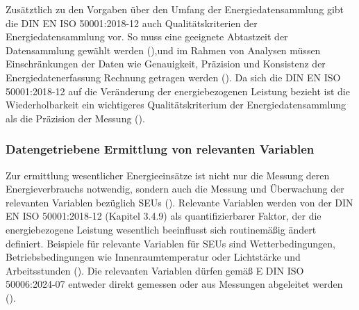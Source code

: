Zusätztlich zu den Vorgaben über den Umfang der Energiedatensammlung gibt die DIN EN ISO 50001:2018-12 auch Qualitätskriterien der Energiedatensammlung vor.
So muss eine geeignete Abtastzeit der Datensammlung gewählt werden (\cite[S. 20]{DIN50006.2024}),und im Rahmen von Analysen müssen Einschränkungen der Daten 
wie Genauigkeit, Präzision und Konsistenz der Energiedatenerfassung Rechnung getragen werden (\cite[S. 37]{DIN50001.2018}).  
Da sich die DIN EN ISO 50001:2018-12 auf die Veränderung der energiebezogenen Leistung bezieht ist die Wiederholbarkeit ein wichtigeres Qualitätskriterium der 
Energiedatensammlung als die Präzision der Messung (\cite[S. 3]{Szajdzicki.2017}).

\subsubsection{Datengetriebene Ermittlung von relevanten Variablen}

Zur ermittlung wesentlicher Energieeinsätze ist nicht nur die Messung deren Energieverbrauchs notwendig, sondern auch die Messung und Überwachung der relevanten Variablen 
bezüglich SEUs (\cite[S. 23]{DIN50001.2018}). 
Relevante Variablen werden von der DIN EN ISO 50001:2018-12 (Kapitel 3.4.9) als quantifizierbarer Faktor, der die energiebezogene Leistung wesentlich beeinflusst sich 
routinemäßig ändert definiert. 
Beispiele für relevante Variablen für SEUs sind Wetterbedingungen, Betriebsbedingungen wie Innenraumtemperatur oder Lichtstärke und Arbeitsstunden (\cite[Kapitel 3.4.9]{DIN50001.2018}).
Die relevanten Variablen dürfen gemäß E DIN ISO 50006:2024-07 entweder direkt gemessen oder aus Messungen abgeleitet werden (\cite[S. 18]{DIN50006.2024}).